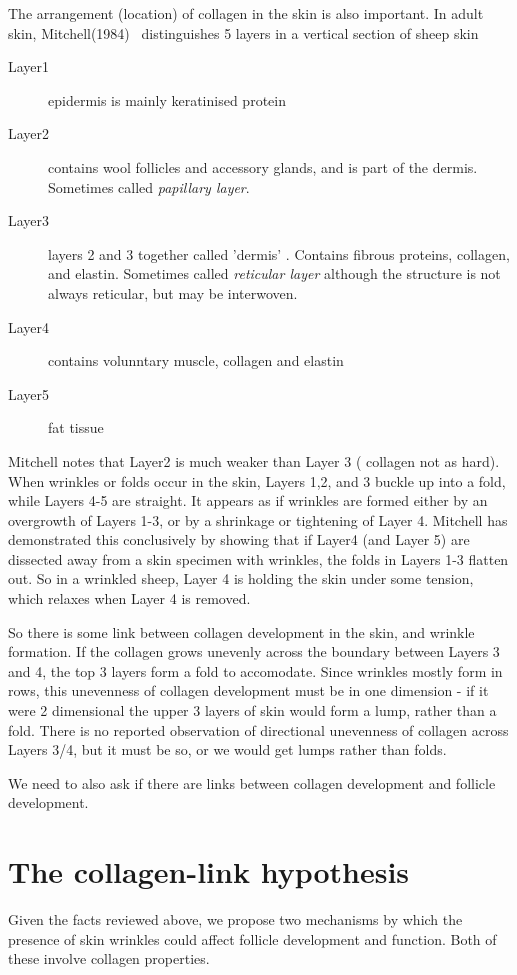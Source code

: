 \documentclass[titlepage]{article}  %
\begin{document}
The arrangement (location) of collagen in the skin is also important. In adult skin, Mitchell(1984)~\cite{mitc:84} distinguishes 5 layers in a vertical section of sheep skin
\begin{description}
\item[Layer1] epidermis is mainly keratinised protein
\item[Layer2] contains wool follicles and accessory glands, and is part of the dermis. Sometimes called {\em papillary layer}.
\item[Layer3] layers 2 and 3 together called 'dermis' . Contains fibrous proteins, collagen, and elastin. Sometimes called {\em reticular layer} although the structure is not always reticular, but may be interwoven.
\item[Layer4] contains volunntary muscle, collagen and elastin
\item[Layer5] fat tissue
\end{description}
Mitchell notes that Layer2 is much weaker than Layer 3 ( collagen not as hard). When wrinkles or folds occur in the skin, Layers 1,2, and 3 buckle up into a fold, while Layers 4-5 are straight. It appears as if wrinkles are formed either by an overgrowth of Layers 1-3, or by a shrinkage or tightening of Layer 4. Mitchell has demonstrated this conclusively by showing that if Layer4 (and Layer 5) are dissected away from a skin specimen with wrinkles, the folds in Layers 1-3 flatten out. So in a wrinkled sheep, Layer 4 is holding the skin under some tension, which relaxes when Layer 4 is removed.

So there is some link between collagen development in the skin, and wrinkle formation. If the collagen grows unevenly across the boundary between Layers 3 and 4, the top 3 layers form a fold to accomodate. Since wrinkles mostly form in rows, this unevenness of collagen development must be in one dimension - if it were 2 dimensional the upper 3 layers of skin would form a lump, rather than a fold. There is no reported observation of directional unevenness of collagen across Layers 3/4, but it must be so, or we would get lumps rather than folds.

We need to also ask if there are links between collagen development and follicle development. 

\section{The collagen-link hypothesis}
Given the facts reviewed above, we propose two mechanisms by which the presence of skin wrinkles could affect follicle development and function.  Both of these involve collagen properties.
\end{document}
